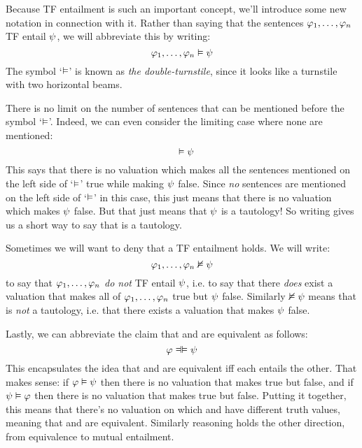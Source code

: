Because TF entailment is such an important concept, we'll introduce some new notation in connection with it.  Rather than saying that the sentences $\mathcal{\varphi}_1, \ldots, \mathcal{\varphi}_n$ TF entail $\mathcal{\psi}$, we will abbreviate this by writing:
	$$\mathcal{\varphi}_1, \ldots, \mathcal{\varphi}_n \vDash \mathcal{\psi}$$
The symbol `$\vDash$' is known as \emph{the double-turnstile}, since it looks like a turnstile with two horizontal beams.

There is no limit on the number of sentences that can be mentioned before the symbol `$\vDash$'. Indeed, we can even consider the limiting case where none are mentioned:
	$$\phantom{\meta{\varphi}}\entails \meta{\psi}$$
This says that there is no valuation which makes all the sentences mentioned on the left side of `$\vDash$' true while making $\mathcal{\psi}$ false. Since \emph{no} sentences are mentioned on the left side of `$\vDash$' in this case, this just means that there is no valuation which makes $\mathcal{\psi}$ false. But that just means that $\mathcal{\psi}$ is a tautology!  So writing \entails \meta{\psi} gives us a short way to say that \meta{\psi} is a tautology. %

Sometimes we will want to deny that a TF entailment holds.  We will write:
$$\mathcal{\varphi}_1, \ldots, \mathcal{\varphi}_n \nvDash\mathcal{\psi}$$
to say that $\mathcal{\varphi}_1, \ldots, \mathcal{\varphi}_n$ \emph{do not} TF entail $\mathcal{\psi}$, i.e. to say that there \emph{does} exist a valuation that makes all of $\mathcal{\varphi}_1, \ldots, \mathcal{\varphi}_n$ true but $\mathcal{\psi}$ false. Similarly $\nvDash \mathcal{\psi}$ means that \meta{\psi} is \emph{not} a tautology, i.e. that there exists a valuation that makes $\mathcal{\psi}$ false.

Lastly, we can abbreviate the claim that \meta{\varphi} and \meta{\psi} are equivalent as follows:
$$\meta{\varphi} \lequiv \meta{\psi}$$
This encapsulates the idea that \meta{\varphi} and \meta{\psi} are equivalent iff each entails the other.  That makes sense: if $\mathcal{\varphi} \vDash \mathcal{\psi}$ then there is no valuation that makes \meta{\varphi} true but \meta{\psi} false, and if $\mathcal{\psi} \vDash \mathcal{\varphi}$ then there is no valuation that makes \meta{\psi} true but \meta{\varphi} false.  Putting it together, this means that there's no valuation on which \meta{\varphi} and \meta{\psi} have different truth values, meaning that \meta{\varphi} and \meta{\psi} are equivalent.  Similarly reasoning holds the other direction, from equivalence to mutual entailment.


